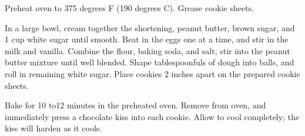 
\info[servings=8,
		time = 100, 
		energy = 304, 
		urlsource = http://allrecipes.com/recipe/9920/peanut-blossoms-ii/]{}

\begin{ingredients}
\end{ingredients}

\begin{preparation}
	\step Preheat oven to 375 degrees F (190 degrees C). Grease cookie sheets.
	
	\step In a large bowl, cream together the shortening, peanut butter, brown sugar, and 1 cup white sugar until smooth. Beat in the eggs one at a time, and stir in the milk and vanilla. Combine the flour, baking soda, and salt; stir into the peanut butter mixture until well blended. Shape tablespoonfuls of dough into balls, and roll in remaining white sugar. Place cookies 2 inches apart on the prepared cookie sheets.
	
	\step Bake for 10 to12 minutes in the preheated oven. Remove from oven, and immediately press a chocolate kiss into each cookie. Allow to cool completely; the kiss will harden as it cools.
\end{preparation}


\begin{notes}
\end{notes}


